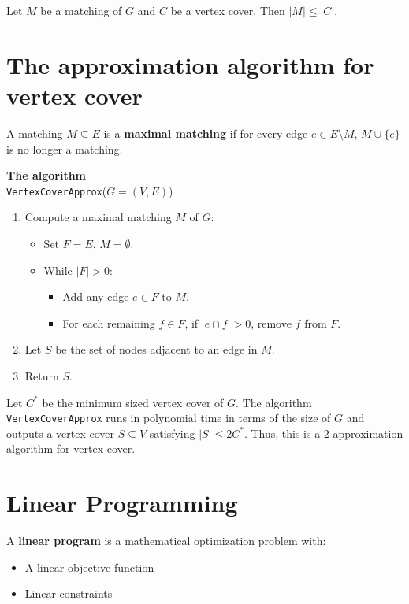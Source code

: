 \documentclass[11  pt]{article}
\begin{document}
\vs{5cm}
\begin{lemma}
Let $M$ be a matching of $G$ and $C$ be a vertex cover. Then $|M| \leq |C|$.
\end{lemma}

\vfill

\section{The approximation algorithm for vertex cover}
A matching $M \subseteq E$ is a \textbf{maximal matching} if for every edge $e \in E \setminus M$, $M \cup \{e\}$ is no longer a matching.

\vs{8cm}
\textbf{The algorithm} \\
\texttt{VertexCoverApprox}($G = (V, E)$)
\begin{enumerate}
    \item Compute a maximal matching $M$ of $G$:
    \begin{itemize}
        \item Set $F = E$, $M = \emptyset$.
        \item While $|F| > 0$:
        \begin{itemize}
            \item Add any edge $e \in F$ to $M$.
            \item For each remaining $f \in F$, if $|e \cap f| > 0$, remove $f$ from $F$.
        \end{itemize}
    \end{itemize}
    \item Let $S$ be the set of nodes adjacent to an edge in $M$.
    \item Return $S$.
\end{enumerate}

\newpage
\begin{theorem}
Let $C^*$ be the minimum sized vertex cover of $G$. The algorithm \texttt{VertexCoverApprox} runs in polynomial time in terms of the size of $G$ and outputs a vertex cover $S \subseteq V$ satisfying $|S| \leq 2C^*$. Thus, this is a 2-approximation algorithm for vertex cover.
\end{theorem}

\section{Linear Programming}

A \textbf{linear program} is a mathematical optimization problem with:
\begin{itemize}
    \item A linear objective function
    \item Linear constraints
\end{itemize}
\end{document}
